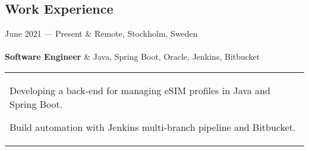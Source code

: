 \documentclass{cv-stylish}
\begin{document}
\begin{center} %








\section{Work Experience}


\begin{JobTable}
  June 2021 --- Present & \hfill Remote, Stockholm, Sweden \\
   \\[3pt]
  \hspace{5mm} \textbf{Software Engineer}
  & \hfill Java, Spring Boot, Oracle, Jenkins, Bitbucket \\
\end{JobTable}
\begin{tabularx}{0.97\linewidth}{X}
\begin{compactitem}
  \item Developing a back-end for managing eSIM profiles in Java and
    Spring Boot.
  \item Build automation with Jenkins multi-branch pipeline and Bitbucket.
\end{compactitem}
\end{tabularx}


\end{center}
\end{document}
